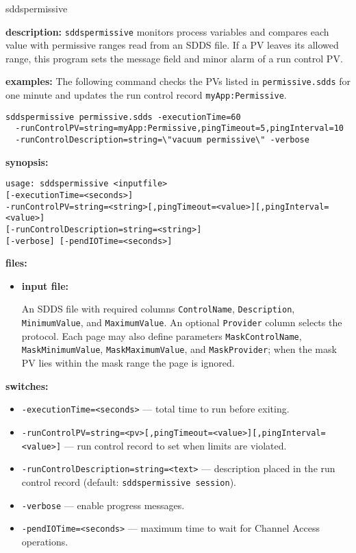 %
\begin{sddsprog}{sddspermissive}
\item \textbf{description:}
\verb+sddspermissive+ monitors process variables and compares each value with
permissive ranges read from an SDDS file.  If a PV leaves its allowed range,
this program sets the message field and minor alarm of a run control PV.

\item \textbf{examples:}
The following command checks the PVs listed in \verb+permissive.sdds+ for one
minute and updates the run control record \verb+myApp:Permissive+.
\begin{verbatim}
sddspermissive permissive.sdds -executionTime=60
  -runControlPV=string=myApp:Permissive,pingTimeout=5,pingInterval=10
  -runControlDescription=string=\"vacuum permissive\" -verbose
\end{verbatim}

\item \textbf{synopsis:}
\begin{verbatim}
usage: sddspermissive <inputfile>
[-executionTime=<seconds>]
-runControlPV=string=<string>[,pingTimeout=<value>][,pingInterval=<value>]
[-runControlDescription=string=<string>]
[-verbose] [-pendIOTime=<seconds>]
\end{verbatim}

\item \textbf{files:}
\begin{itemize}
  \item \textbf{input file:}\par
An SDDS file with required columns \verb+ControlName+, \verb+Description+,
\verb+MinimumValue+, and \verb+MaximumValue+.  An optional \verb+Provider+
column selects the protocol.  Each page may also define parameters
\verb+MaskControlName+, \verb+MaskMinimumValue+, \verb+MaskMaximumValue+,
and \verb+MaskProvider+; when the mask PV lies within the mask range the page
is ignored.
\end{itemize}

\item \textbf{switches:}
\begin{itemize}
  \item {\tt -executionTime=<seconds>} --- total time to run before exiting.
  \item {\tt -runControlPV=string=<pv>[,pingTimeout=<value>][,pingInterval=<value>]} --- run
  control record to set when limits are violated.
  \item {\tt -runControlDescription=string=<text>} --- description placed in the run
  control record (default: \verb+sddspermissive session+).
  \item {\tt -verbose} --- enable progress messages.
  \item {\tt -pendIOTime=<seconds>} --- maximum time to wait for Channel Access operations.
\end{itemize}


\end{sddsprog}
